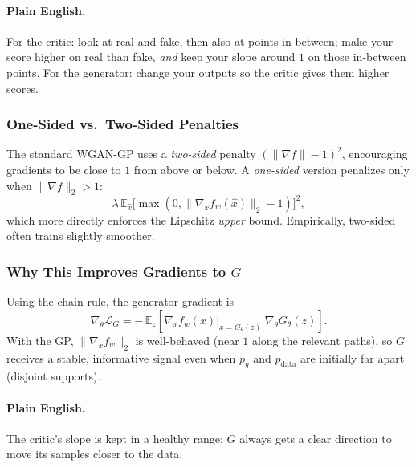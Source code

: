 \documentclass[11pt]{article}
\theoremstyle{remark}
\begin{document}
\paragraph{Plain English.}
For the critic: look at real and fake, then also at points in between; make your score higher on real than fake, \emph{and} keep your slope around $1$ on those in-between points. For the generator: change your outputs so the critic gives them higher scores.

\subsubsection{One-Sided vs.\ Two-Sided Penalties}
The standard WGAN-GP uses a \emph{two-sided} penalty $(\|\nabla f\|-1)^2$, encouraging gradients to be close to $1$ from above or below. A \emph{one-sided} version penalizes only when $\|\nabla f\|_2>1$:
\[
\lambda\,\mathbb{E}_{\hat{x}}\!\big[\max(0,\|\nabla_{\hat{x}} f_w(\hat{x})\|_2 - 1)\big]^2,
\]
which more directly enforces the Lipschitz \emph{upper} bound. Empirically, two-sided often trains slightly smoother.

\subsubsection{Why This Improves Gradients to $G$}
Using the chain rule, the generator gradient is
\[
\nabla_\theta \mathcal{L}_G
= -\,\mathbb{E}_{z}\!\left[\nabla_x f_w(x)\big|_{x=G_\theta(z)} \;\nabla_\theta G_\theta(z)\right].
\]
With the GP, $\|\nabla_x f_w\|_2$ is well-behaved (near $1$ along the relevant paths), so $G$ receives a stable, informative signal even when $p_g$ and $p_{\text{data}}$ are initially far apart (disjoint supports).

\paragraph{Plain English.}
The critic's slope is kept in a healthy range; $G$ always gets a clear direction to move its samples closer to the data.
\end{document}
